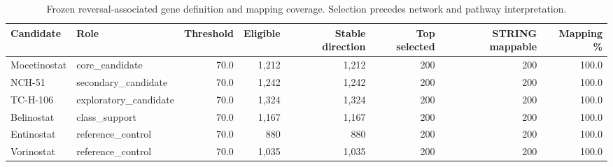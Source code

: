 \begingroup
\footnotesize
\begin{table}[H]
\centering
\caption{Frozen reversal-associated gene definition and mapping coverage. Selection precedes network and pathway interpretation.}
\label{tab:s_genedef}
\begin{tabular}{@{}llrrrrrr@{}}
\toprule
Candidate & Role & Threshold & Eligible & Stable direction & Top selected & STRING mappable & Mapping \% \\
\midrule
Mocetinostat & core\_candidate & 70.0 & 1,212 & 1,212 & 200 & 200 & 100.0 \\
NCH-51 & secondary\_candidate & 70.0 & 1,242 & 1,242 & 200 & 200 & 100.0 \\
TC-H-106 & exploratory\_candidate & 70.0 & 1,324 & 1,324 & 200 & 200 & 100.0 \\
Belinostat & class\_support & 70.0 & 1,167 & 1,167 & 200 & 200 & 100.0 \\
Entinostat & reference\_control & 70.0 & 880 & 880 & 200 & 200 & 100.0 \\
Vorinostat & reference\_control & 70.0 & 1,035 & 1,035 & 200 & 200 & 100.0 \\
\bottomrule
\end{tabular}
\end{table}
\endgroup

